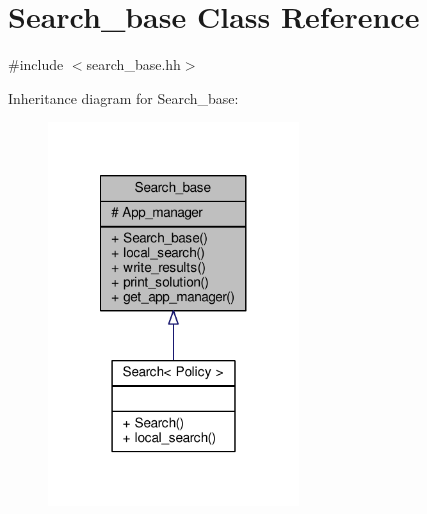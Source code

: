 \hypertarget{classSearch__base}{\section{Search\-\_\-base Class Reference}
\label{classSearch__base}
}


{\ttfamily \#include $<$search\-\_\-base.\-hh$>$}



Inheritance diagram for Search\-\_\-base\-:
\nopagebreak
\begin{figure}[H]
\begin{center}
\leavevmode
\includegraphics[width=188pt]{classSearch__base__inherit__graph}
\end{center}
\end{figure}


